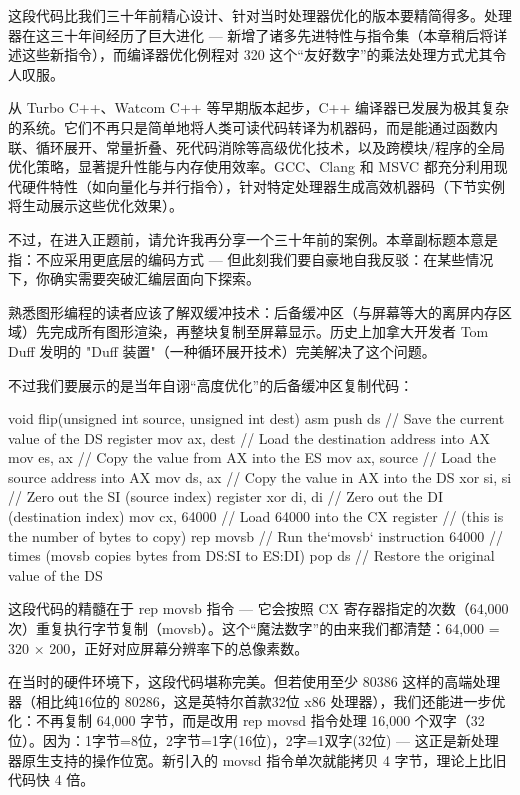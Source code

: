 这段代码比我们三十年前精心设计、针对当时处理器优化的版本要精简得多。处理器在这三十年间经历了巨大进化 --- 新增了诸多先进特性与指令集（本章稍后将详述这些新指令），而编译器优化例程对 320 这个“友好数字”的乘法处理方式尤其令人叹服。

从 Turbo C++、Watcom C++ 等早期版本起步，C++ 编译器已发展为极其复杂的系统。它们不再只是简单地将人类可读代码转译为机器码，而是能通过函数内联、循环展开、常量折叠、死代码消除等高级优化技术，以及跨模块/程序的全局优化策略，显著提升性能与内存使用效率。GCC、Clang 和 MSVC 都充分利用现代硬件特性（如向量化与并行指令），针对特定处理器生成高效机器码（下节实例将生动展示这些优化效果）。

不过，在进入正题前，请允许我再分享一个三十年前的案例。本章副标题本意是指：不应采用更底层的编码方式 --- 但此刻我们要自豪地自我反驳：在某些情况下，你确实需要突破汇编层面向下探索。

熟悉图形编程的读者应该了解双缓冲技术：后备缓冲区（与屏幕等大的离屏内存区域）先完成所有图形渲染，再整块复制至屏幕显示。历史上加拿大开发者 Tom Duff 发明的 "Duff 装置"（一种循环展开技术）完美解决了这个问题。

不过我们要展示的是当年自诩“高度优化”的后备缓冲区复制代码：

\begin{cpp}
void flip(unsigned int source, unsigned int dest) {
asm {
    push ds // Save the current value of the DS register
    mov ax, dest // Load the destination address into AX
    mov es, ax // Copy the value from AX into the ES
    mov ax, source // Load the source address into AX
    mov ds, ax // Copy the value in AX into the DS
    xor si, si // Zero out the SI (source index) register
    xor di, di // Zero out the DI (destination index)
    mov cx, 64000 // Load 64000 into the CX register
    // (this is the number of bytes to copy)
    rep movsb // Run the`movsb` instruction 64000
    // times (movsb copies bytes from DS:SI to ES:DI)
    pop ds // Restore the original value of the DS
  } 
}
\end{cpp}

这段代码的精髓在于 rep movsb 指令 --- 它会按照 CX 寄存器指定的次数（64,000次）重复执行字节复制（movsb）。这个“魔法数字”的由来我们都清楚：64,000 = 320 × 200，正好对应屏幕分辨率下的总像素数。

在当时的硬件环境下，这段代码堪称完美。但若使用至少 80386 这样的高端处理器（相比纯16位的 80286，这是英特尔首款32位 x86 处理器），我们还能进一步优化：不再复制 64,000 字节，而是改用 rep movsd 指令处理 16,000 个双字（32位）。因为：1字节=8位，2字节=1字(16位)，2字=1双字(32位) --- 这正是新处理器原生支持的操作位宽。新引入的 movsd 指令单次就能拷贝 4 字节，理论上比旧代码快 4 倍。


